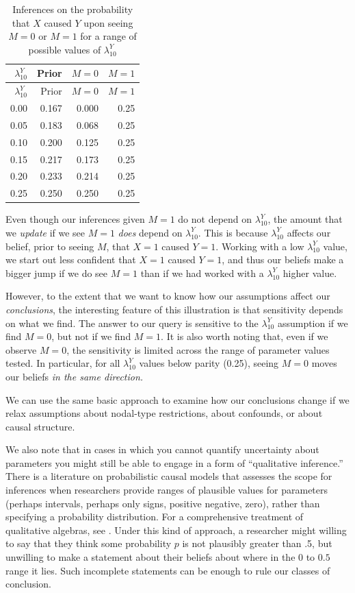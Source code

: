 \documentclass[
  12pt,
]{book}
\begin{document}
\begin{longtable}[]{@{}rrrr@{}}
\caption{\label{tab:ch15ranges}Inferences on the probability that \(X\) caused \(Y\) upon seeing \(M=0\) or \(M=1\) for a range of possible values of \(\lambda^Y_{10}\)}\tabularnewline
\toprule
\(\lambda^Y_{10}\) & Prior & \(M=0\) & \(M=1\) \\
\midrule
\endfirsthead
\toprule
\(\lambda^Y_{10}\) & Prior & \(M=0\) & \(M=1\) \\
\midrule
\endhead
0.00 & 0.167 & 0.000 & 0.25 \\
0.05 & 0.183 & 0.068 & 0.25 \\
0.10 & 0.200 & 0.125 & 0.25 \\
0.15 & 0.217 & 0.173 & 0.25 \\
0.20 & 0.233 & 0.214 & 0.25 \\
0.25 & 0.250 & 0.250 & 0.25 \\
\bottomrule
\end{longtable}

Even though our inferences given \(M=1\) do not depend on \(\lambda^Y_{10}\), the amount that we \emph{update} if we see \(M=1\) \emph{does} depend on \(\lambda^Y_{10}\). This is because \(\lambda^Y_{10}\) affects our belief, prior to seeing \(M\), that \(X=1\) caused \(Y=1\). Working with a low \(\lambda^Y_{10}\) value, we start out less confident that \(X=1\) caused \(Y=1\), and thus our beliefs make a bigger jump if we do see \(M=1\) than if we had worked with a \(\lambda^Y_{10}\) higher value.

However, to the extent that we want to know how our assumptions affect our \emph{conclusions}, the interesting feature of this illustration is that sensitivity depends on what we find. The answer to our query is sensitive to the \(\lambda^Y_{10}\) assumption if we find \(M=0\), but not if we find \(M=1\). It is also worth noting that, even if we observe \(M=0\), the sensitivity is limited across the range of parameter values tested. In particular, for all \(\lambda^Y_{10}\) values below parity (0.25), seeing \(M=0\) moves our beliefs \emph{in the same direction.}

We can use the same basic approach to examine how our conclusions change if we relax assumptions about nodal-type restrictions, about confounds, or about causal structure.

We also note that in cases in which you cannot quantify uncertainty about parameters you might still be able to engage in a form of ``qualitative inference.'' There is a literature on probabilistic causal models that assesses the scope for inferences when researchers provide ranges of plausible values for parameters (perhaps intervals, perhaps only signs, positive negative, zero), rather than specifying a probability distribution. For a comprehensive treatment of qualitative algebras, see \citet{parsons2001qualitative}. Under this kind of approach, a researcher might willing to say that they think some probability \(p\) is not plausibly greater than .5, but unwilling to make a statement about their beliefs about where in the \(0\) to \(0.5\) range it lies. Such incomplete statements can be enough to rule our classes of conclusion.
\end{document}
